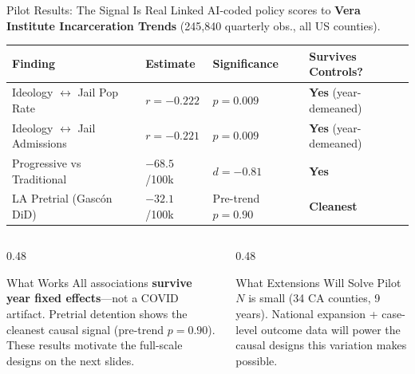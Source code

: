 \documentclass[aspectratio=169, 11pt]{beamer}
\newcommand{\tablefont}{\fontsize{7.5}{9.5}\selectfont}
\begin{document}
\begin{frame}{Pilot Results: The Signal Is Real}
{\small Linked AI-coded policy scores to \textbf{Vera Institute Incarceration Trends} (245,840 quarterly obs., all US counties).}
\vspace{4pt}
{\tablefont
\begin{tabularx}{\textwidth}{lllX}
\toprule
\textbf{Finding} & \textbf{Estimate} & \textbf{Significance} & \textbf{Survives Controls?} \\
\midrule
Ideology $\leftrightarrow$ Jail Pop Rate & $r = -0.222$ & $p = 0.009$ & \textcolor{medalistgreen}{\textbf{Yes}} (year-demeaned) \\
Ideology $\leftrightarrow$ Jail Admissions & $r = -0.221$ & $p = 0.009$ & \textcolor{medalistgreen}{\textbf{Yes}} (year-demeaned) \\
Progressive vs Traditional & $-68.5$/100k & $d = -0.81$ & \textcolor{medalistgreen}{\textbf{Yes}} \\
LA Pretrial (Gasc\'on DiD) & $-32.1$/100k & Pre-trend $p = 0.90$ & \textcolor{medalistgreen}{\textbf{Cleanest}} \\
\bottomrule
\end{tabularx}}
\vspace{4pt}
\begin{columns}[T]
\begin{column}{0.48\textwidth}
\begin{exampleblock}{What Works}
{\small All associations \textbf{survive year fixed effects}---not a COVID artifact. Pretrial detention shows the cleanest causal signal (pre-trend $p = 0.90$). These results motivate the full-scale designs on the next slides.}
\end{exampleblock}
\end{column}
\begin{column}{0.48\textwidth}
\begin{block}{What Extensions Will Solve}
{\small Pilot $N$ is small (34 CA counties, 9 years). National expansion + case-level outcome data will power the causal designs this variation makes possible.}
\end{block}
\end{column}
\end{columns}
\end{frame}
\end{document}
